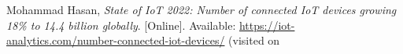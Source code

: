 \documentclass[../DoAn.tex]{subfiles}
\begin{document}


\cite{IoTAnalytics}	Mohammad Hasan, \textit{State of IoT 2022: Number of connected IoT devices growing 18\% to 14.4 billion globally}. [Online]. Available: \url{https://iot-analytics.com/number-connected-iot-devices/} (visited on
\end{document}
